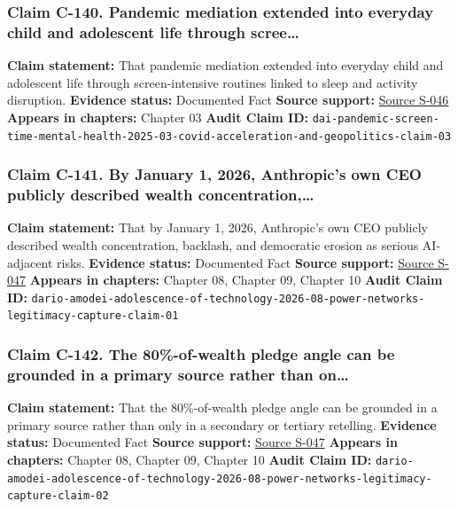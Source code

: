 \documentclass[
  american,
  11pt,
  letterpaper,
]{article}
\begin{document}
\subsubsection{Claim C-140. Pandemic mediation extended into everyday
child and adolescent life through
scree\ldots{}}\label{claim-c-140-pandemic-mediation-extended-into-everyday-child-and-adolescent-life-through-scree}

\textbf{Claim statement:} That pandemic mediation extended into everyday
child and adolescent life through screen-intensive routines linked to
sleep and activity disruption. \textbf{Evidence status:} Documented Fact
\textbf{Source support:}
\hyperref[source-s-046-excessive-screen-time-is-associated-with-mental-health-problems-and-adhd-in-us-children-and-adolescents-physical-activity-and-sleep-as-parallel-mediators]{Source
S-046} \textbf{Appears in chapters:} Chapter 03 \textbf{Audit Claim ID:}
\texttt{dai-pandemic-screen-time-mental-health-2025-03-covid-acceleration-and-geopolitics-claim-03}

\subsubsection{Claim C-141. By January 1, 2026, Anthropic's own CEO
publicly described wealth
concentration,\ldots{}}\label{claim-c-141-by-january-1-2026-anthropic-s-own-ceo-publicly-described-wealth-concentration}

\textbf{Claim statement:} That by January 1, 2026, Anthropic's own CEO
publicly described wealth concentration, backlash, and democratic
erosion as serious AI-adjacent risks. \textbf{Evidence status:}
Documented Fact \textbf{Source support:}
\hyperref[source-s-047-the-adolescence-of-technology]{Source S-047}
\textbf{Appears in chapters:} Chapter 08, Chapter 09, Chapter 10
\textbf{Audit Claim ID:}
\texttt{dario-amodei-adolescence-of-technology-2026-08-power-networks-legitimacy-capture-claim-01}

\subsubsection{Claim C-142. The 80\%-of-wealth pledge angle can be
grounded in a primary source rather than
on\ldots{}}\label{claim-c-142-the-80-of-wealth-pledge-angle-can-be-grounded-in-a-primary-source-rather-than-on}

\textbf{Claim statement:} That the 80\%-of-wealth pledge angle can be
grounded in a primary source rather than only in a secondary or tertiary
retelling. \textbf{Evidence status:} Documented Fact \textbf{Source
support:} \hyperref[source-s-047-the-adolescence-of-technology]{Source
S-047} \textbf{Appears in chapters:} Chapter 08, Chapter 09, Chapter 10
\textbf{Audit Claim ID:}
\texttt{dario-amodei-adolescence-of-technology-2026-08-power-networks-legitimacy-capture-claim-02}
\end{document}
